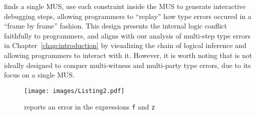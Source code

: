 \chameleon{} finds a single MUS, use each constraint inside the MUS to generate interactive debugging steps, allowing programmers to ``replay'' how type errors occured in a ``frame by frame'' fashion. This design presents the internal logic conflict faithfully to programmers, and aligns with our analysis of multi-step type errors in Chapter~\ref{chap:introduction} by visualizing the chain of logical inference and allowing programmers to interact with it. However, it is worth noting that \chameleon{} is not ideally designed to conquer multi-witness and multi-party type errors, due to its focus on a single MUS.




\begin{figure}[ht]
    \centering
    \texttt{[image: images/Listing2.pdf]}
    \caption{\chameleon{} reports an error in the expressions \texttt{f} and \texttt{z}}
    \label{fig:listing2}
\end{figure}

